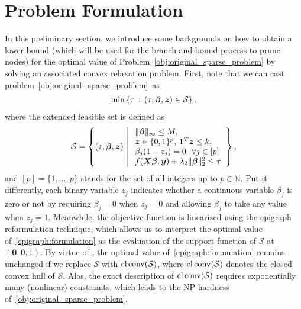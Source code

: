 \section{Problem Formulation}
In this preliminary section, we introduce some backgrounds on how to obtain a lower bound (which will be used for the branch-and-bound process to prune nodes) for the optimal value of Problem~\eqref{obj:original_sparse_problem} by solving an associated convex relaxation problem.
First, note that we can cast problem~\eqref{obj:original_sparse_problem}~as 
\begin{align}
    \label{epigraph:formulation}
    \min \left\{ \tau \,:\, (\tau, \bm{\beta}, \bm{z}) \in \mathcal S \right\},
\end{align}
where the extended feasible set is defined as
\begin{align}
    \label{eq:S}
    \mathcal{S} = \left\{ (\tau, \bm{\beta}, \bm{z})  \;\middle|\;
    \begin{array}{l} 
        \| \bm{\beta} \|_\infty \leq M, \\
        \bm{z} \in \{0, 1\}^p, \, \mathbf{1}^T \bm{z} \leq k, \\
        \beta_j ( 1 - z_j) = 0 ~~ \forall j \in [p] \\
        f(\bm{X} \bm{\beta}, \bm{y}) + \lambda_2 \| \bm{\beta} \|_2^2 \leq \tau
    \end{array}
    \right\},
\end{align}
and $[p] = \{1, \dots, p \}$ stands for the set of all integers up to $p \in \mathbb N$.
Put it differently, each binary variable $z_j$ indicates whether a continuous variable $\beta_j$ is zero or not by requiring $\beta_j = 0$ when $z_j = 0$ and allowing $\beta_j$ to take any value when $z_j = 1$. 
Meanwhile, the objective function is linearized using the epigraph reformulation technique, which allows us to interpret the optimal value of~\eqref{epigraph:formulation} as the evaluation of the support function of $\mathcal S$ at $(\bm 0, \bm 0, 1)$.
By virtue of \citep[\S13]{rockafellar1970convex}, the optimal value of~\eqref{epigraph:formulation} remains unchanged if we replace $\mathcal S$ with $\operatorname{cl} \operatorname{conv}(\mathcal S)$, where $\operatorname{cl} \operatorname{conv}(\mathcal S)$ denotes the closed convex hull of $\mathcal S$. 
Alas, the exact description of $\operatorname{cl} \operatorname{conv}(\mathcal S)$ requires exponentially many (nonlinear) constraints, which leads to the NP-hardness of~\eqref{obj:original_sparse_problem}.


